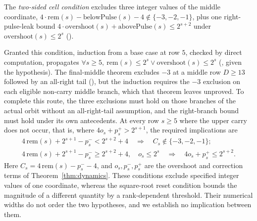 \begin{defn}
The \emph{two-sided cell condition} excludes three integer values of the middle coordinate,
$4\cdot\mathrm{rem}(s)-\mathrm{belowPulse}(s)-4\notin\{-3,-2,-1\}$, plus one right-pulse-leak
bound $4\cdot\mathrm{overshoot}(s)+\mathrm{abovePulse}(s)\le2^{s+2}$ under
$\mathrm{overshoot}(s)\le2^s$ ().
\end{defn}
Granted this condition, induction from a base case at row $5$, checked by direct computation, propagates
$\forall s\ge5,\ \mathrm{rem}(s)\le2^s\vee\mathrm{overshoot}(s)\le2^s$
(,
given the hypothesis). The final-middle theorem excludes $-3$ at a
middle row $D\ge13$ followed by an all-right tail
(),
but the induction requires the $-3$ exclusion on each eligible non-carry
middle branch, which that theorem leaves unproved. To complete this route, the
three exclusions must hold on those branches of the actual orbit
without an all-right-tail assumption, and the right-branch bound must
hold under its own antecedents. At every row $s\ge5$
where the upper carry does not occur, that is, where
$4o_s+p_s^+>2^{s+1}$, the required implications are
\[
 \begin{gathered}
 4\,\mathrm{rem}(s)+2^{s+1}-p_s^-<2^{s+2}+4
 \quad\Longrightarrow\quad C_s\notin\{-3,-2,-1\};\\[3pt]
 4\,\mathrm{rem}(s)+2^{s+1}-p_s^-\ge2^{s+2}+4,\quad o_s\le2^s
 \quad\Longrightarrow\quad 4o_s+p_s^+\le2^{s+2}.
 \end{gathered}
\]
Here $C_s=4\,\mathrm{rem}(s)-p_s^- -4$, and $o_s,p_s^-,p_s^+$
are the overshoot and correction terms of Theorem~\ref{thm:dynamics}.
These conditions exclude specified integer values of one coordinate, whereas the
square-root reset condition bounds the magnitude of a
different quantity by a rank-dependent threshold.  Their numerical
widths do not order the two hypotheses, and we establish no implication between
them.

